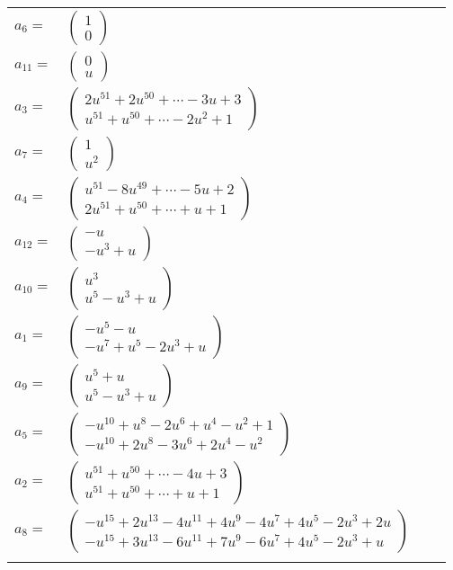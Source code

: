 \documentclass[1p]{elsarticle_modified}
\theoremstyle{definition}
\begin{document}
\begin{tabular}{m{7pt} m{180pt} m{7pt} m{180pt} }
\flushright $a_{6}=$&$\begin{pmatrix}1\\0\end{pmatrix}$ \\
\flushright $a_{11}=$&$\begin{pmatrix}0\\u\end{pmatrix}$ \\
\flushright $a_{3}=$&$\begin{pmatrix}2 u^{51}+2 u^{50}+\cdots-3 u+3\\u^{51}+u^{50}+\cdots-2 u^2+1\end{pmatrix}$ \\
\flushright $a_{7}=$&$\begin{pmatrix}1\\u^2\end{pmatrix}$ \\
\flushright $a_{4}=$&$\begin{pmatrix}u^{51}-8 u^{49}+\cdots-5 u+2\\2 u^{51}+u^{50}+\cdots+u+1\end{pmatrix}$ \\
\flushright $a_{12}=$&$\begin{pmatrix}- u\\- u^3+u\end{pmatrix}$ \\
\flushright $a_{10}=$&$\begin{pmatrix}u^3\\u^5- u^3+u\end{pmatrix}$ \\
\flushright $a_{1}=$&$\begin{pmatrix}- u^5- u\\- u^7+u^5-2 u^3+u\end{pmatrix}$ \\
\flushright $a_{9}=$&$\begin{pmatrix}u^5+u\\u^5- u^3+u\end{pmatrix}$ \\
\flushright $a_{5}=$&$\begin{pmatrix}- u^{10}+u^8-2 u^6+u^4- u^2+1\\- u^{10}+2 u^8-3 u^6+2 u^4- u^2\end{pmatrix}$ \\
\flushright $a_{2}=$&$\begin{pmatrix}u^{51}+u^{50}+\cdots-4 u+3\\u^{51}+u^{50}+\cdots+u+1\end{pmatrix}$ \\
\flushright $a_{8}=$&$\begin{pmatrix}- u^{15}+2 u^{13}-4 u^{11}+4 u^9-4 u^7+4 u^5-2 u^3+2 u\\- u^{15}+3 u^{13}-6 u^{11}+7 u^9-6 u^7+4 u^5-2 u^3+u\end{pmatrix}$\\&\end{tabular}
\end{document}
